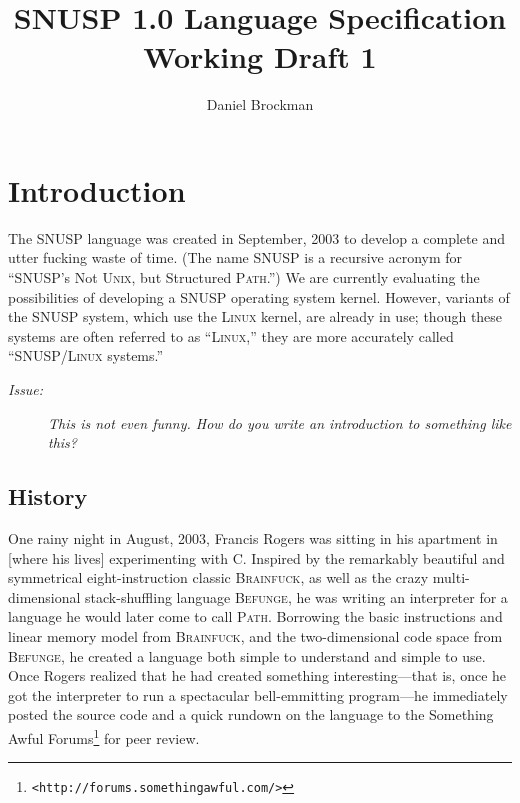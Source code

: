 \documentclass[a4paper]{article}
\title{\textsc{SNUSP} 1.0 Language Specification\\Working Draft 1}
\author{Daniel Brockman}
\newcommand\comment[2]{\begin{description} \item[#1] #2 \end{description}}
\newcommand\issue[1]{{\comment{\textit{Issue:}}{\it #1}}}
\begin{document}
\maketitle

\tableofcontents




\section{Introduction}

The \textsc{SNUSP} language was created in September, 2003 to develop a
complete and utter fucking waste of time.  (The name \textsc{SNUSP} is a
recursive acronym for ``\textsc{SNUSP}'s Not \textsc{Unix}, but Structured
\textsc{Path}.'')  We are currently evaluating the possibilities of developing
a \textsc{SNUSP} operating system kernel.  However, variants of the
\textsc{SNUSP} system, which use the \textsc{Linux} kernel, are already in
use; though these systems are often referred to as ``\textsc{Linux},'' they
are more accurately called ``\textsc{SNUSP}/\textsc{Linux} systems.''

\issue{This is not even funny.  How do you write an introduction to something
like this?}



\subsection{History}

One rainy night in August, 2003, Francis Rogers was sitting in his apartment
in [where his lives] experimenting with \textsc{C}.  Inspired by the
remarkably beautiful and symmetrical eight-instruction classic
\textsc{Brainfuck}, as well as the crazy multi-dimensional stack-shuffling
language \textsc{Befunge}, he was writing an interpreter for a language he
would later come to call \textsc{Path}.  Borrowing the basic instructions and
linear memory model from \textsc{Brainfuck}, and the two-dimensional code
space from \textsc{Befunge}, he created a language both simple to understand
and simple to use.  Once Rogers realized that he had created something
interesting---that is, once he got the interpreter to run a
spectacular bell-emmitting program---he immediately posted the source code and
a quick rundown on the language to the Something Awful
Forums\footnote{\texttt{<http://forums.somethingawful.com/>}} for peer review.
\end{document}
